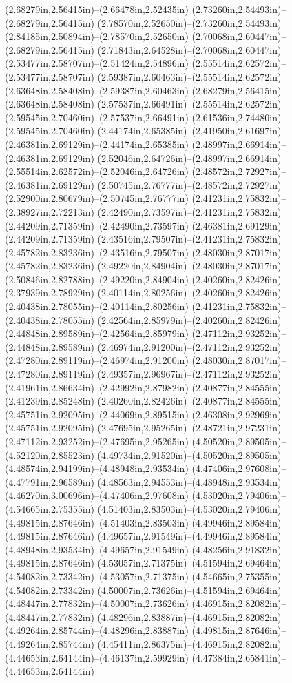 (2.68279in,2.56415in)--(2.66478in,2.52435in) (2.73260in,2.54493in)--(2.68279in,2.56415in) (2.78570in,2.52650in)--(2.73260in,2.54493in) (2.84185in,2.50894in)--(2.78570in,2.52650in) (2.70068in,2.60447in)--(2.68279in,2.56415in) (2.71843in,2.64528in)--(2.70068in,2.60447in) (2.53477in,2.58707in)--(2.51424in,2.54896in) (2.55514in,2.62572in)--(2.53477in,2.58707in) (2.59387in,2.60463in)--(2.55514in,2.62572in) (2.63648in,2.58408in)--(2.59387in,2.60463in) (2.68279in,2.56415in)--(2.63648in,2.58408in) (2.57537in,2.66491in)--(2.55514in,2.62572in) (2.59545in,2.70460in)--(2.57537in,2.66491in) (2.61536in,2.74480in)--(2.59545in,2.70460in) (2.44174in,2.65385in)--(2.41950in,2.61697in) (2.46381in,2.69129in)--(2.44174in,2.65385in) (2.48997in,2.66914in)--(2.46381in,2.69129in) (2.52046in,2.64726in)--(2.48997in,2.66914in) (2.55514in,2.62572in)--(2.52046in,2.64726in) (2.48572in,2.72927in)--(2.46381in,2.69129in) (2.50745in,2.76777in)--(2.48572in,2.72927in) (2.52900in,2.80679in)--(2.50745in,2.76777in) (2.41231in,2.75832in)--(2.38927in,2.72213in) (2.42490in,2.73597in)--(2.41231in,2.75832in) (2.44209in,2.71359in)--(2.42490in,2.73597in) (2.46381in,2.69129in)--(2.44209in,2.71359in) (2.43516in,2.79507in)--(2.41231in,2.75832in) (2.45782in,2.83236in)--(2.43516in,2.79507in) (2.48030in,2.87017in)--(2.45782in,2.83236in) (2.49220in,2.84904in)--(2.48030in,2.87017in) (2.50846in,2.82788in)--(2.49220in,2.84904in) (2.40260in,2.82426in)--(2.37939in,2.78929in) (2.40114in,2.80256in)--(2.40260in,2.82426in) (2.40438in,2.78055in)--(2.40114in,2.80256in) (2.41231in,2.75832in)--(2.40438in,2.78055in) (2.42564in,2.85979in)--(2.40260in,2.82426in) (2.44848in,2.89589in)--(2.42564in,2.85979in) (2.47112in,2.93252in)--(2.44848in,2.89589in) (2.46974in,2.91200in)--(2.47112in,2.93252in) (2.47280in,2.89119in)--(2.46974in,2.91200in) (2.48030in,2.87017in)--(2.47280in,2.89119in) (2.49357in,2.96967in)--(2.47112in,2.93252in) (2.41961in,2.86634in)--(2.42992in,2.87982in) (2.40877in,2.84555in)--(2.41239in,2.85248in) (2.40260in,2.82426in)--(2.40877in,2.84555in) (2.45751in,2.92095in)--(2.44069in,2.89515in) (2.46308in,2.92969in)--(2.45751in,2.92095in) (2.47695in,2.95265in)--(2.48721in,2.97231in) (2.47112in,2.93252in)--(2.47695in,2.95265in) (4.50520in,2.89505in)--(4.52120in,2.85523in) (4.49734in,2.91520in)--(4.50520in,2.89505in) (4.48574in,2.94199in)--(4.48948in,2.93534in) (4.47406in,2.97608in)--(4.47791in,2.96589in) (4.48563in,2.94553in)--(4.48948in,2.93534in) (4.46270in,3.00696in)--(4.47406in,2.97608in) (4.53020in,2.79406in)--(4.54665in,2.75355in) (4.51403in,2.83503in)--(4.53020in,2.79406in) (4.49815in,2.87646in)--(4.51403in,2.83503in) (4.49946in,2.89584in)--(4.49815in,2.87646in) (4.49657in,2.91549in)--(4.49946in,2.89584in) (4.48948in,2.93534in)--(4.49657in,2.91549in) (4.48256in,2.91832in)--(4.49815in,2.87646in) (4.53057in,2.71375in)--(4.51594in,2.69464in) (4.54082in,2.73342in)--(4.53057in,2.71375in) (4.54665in,2.75355in)--(4.54082in,2.73342in) (4.50007in,2.73626in)--(4.51594in,2.69464in) (4.48447in,2.77832in)--(4.50007in,2.73626in) (4.46915in,2.82082in)--(4.48447in,2.77832in) (4.48296in,2.83887in)--(4.46915in,2.82082in) (4.49264in,2.85744in)--(4.48296in,2.83887in) (4.49815in,2.87646in)--(4.49264in,2.85744in) (4.45411in,2.86375in)--(4.46915in,2.82082in) (4.44653in,2.64144in)--(4.46137in,2.59929in) (4.47384in,2.65841in)--(4.44653in,2.64144in) 